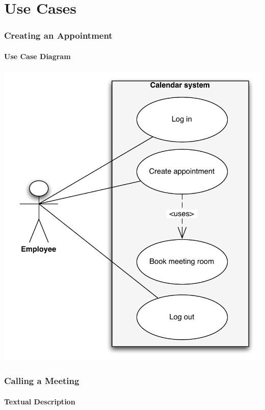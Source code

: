 \documentclass{article}
\begin{document}
\part{Use Cases}

\section{Creating an Appointment}

\subsection{Use Case Diagram}

\includegraphics[scale=0.9]{usecaseFP1.pdf}

\section{Calling a Meeting}

\subsection{Textual Description}
\end{document}
